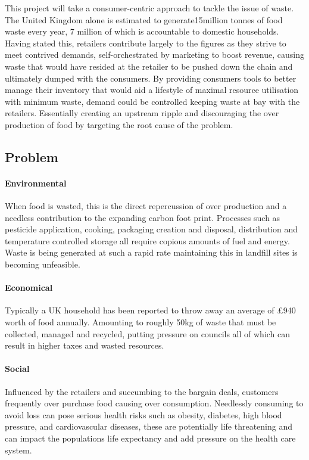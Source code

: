 \documentclass[a4paper, 11pt]{article}
\begin{document}
\vspace{\baselineskip}

This project will take a consumer-centric approach to tackle the issue of waste. The United Kingdom alone is estimated to generate15million tonnes of food waste every year, 7 million of which is accountable to domestic households. Having stated this, retailers contribute largely to the figures as they strive to meet contrived demands, self-orchestrated by marketing to boost revenue, causing waste that would have resided at the retailer to be pushed down the chain and ultimately dumped with the consumers. By providing consumers tools to better manage their inventory that would aid a lifestyle of maximal resource utilisation with minimum waste, demand could be controlled keeping waste at bay with the retailers. Essentially creating an upstream ripple and discouraging the over production of food by targeting the root cause of the problem.

\vspace{\baselineskip}
\vspace{\baselineskip}
\vspace{\baselineskip}

\subsection{Problem}
\paragraph{Environmental} When food is wasted, this is the direct repercussion of over production and a needless contribution to the expanding carbon foot print. Processes such as pesticide application, cooking, packaging creation and disposal, distribution and temperature controlled storage all require copious amounts of fuel and energy. Waste is being generated at such a rapid rate maintaining this in landfill sites is becoming unfeasible.

\paragraph{Economical} Typically a UK household has been reported to throw away an average of \pounds940 worth of food annually. Amounting to roughly 50kg of waste that must be collected, managed and recycled, putting pressure on councils all of which can result in higher taxes and wasted resources.

\paragraph{Social} Influenced by the retailers and succumbing to the bargain deals, customers frequently over purchase food causing over consumption. Needlessly consuming to avoid loss can pose serious health risks such as obesity, diabetes, high blood pressure, and cardiovascular diseases, these are potentially life threatening and can impact the populations life expectancy and add pressure on the health care system. 
\end{document}
